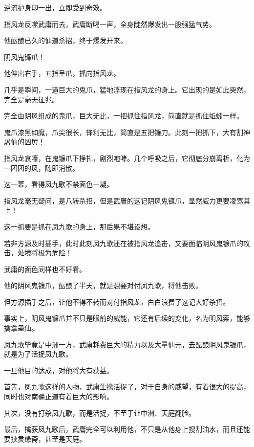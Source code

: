 
\begin{this_body}



逆流护身印一出，立即受到奇效。

指风龙反噬武庸而去，武庸断喝一声，全身陡然爆发出一股强猛气势。

他酝酿已久的仙道杀招，终于爆发开来。

阴风鬼镰爪！

他伸出右手，五指呈爪，抓向指风龙。

几乎是瞬间，一道巨大的鬼爪，猛地浮现在指风龙的身上。它出现的是如此突然，完全是毫无征兆。

完全由阴风组成的鬼爪，巨大无比，一把抓住指风龙，简直就是抓住蚯蚓一样。

鬼爪漆黑如魔，爪尖很长，锋利无比，简直是五把镰刀。此刻一把抓下，大有割神屠仙的凶厉！

指风龙哀嚎，在鬼镰爪下挣扎，剧烈咆哮。几个呼吸之后，它彻底分崩离析，化为一团团的风，随即消散。

这一幕，看得凤九歌不禁面色一凝。

指风龙毫无疑问，是八转杀招，但是武庸的这记阴风鬼镰爪，显然威力更要凌驾其上！

这一抓要是抓在凤九歌的身上，那后果不堪设想。

若非方源及时插手，此时此刻凤九歌还在被指风龙追击，又要面临阴风鬼镰爪的攻击，处境将极为危险！

武庸的面色同样也不好看。

他的阴风鬼镰爪，酝酿了半天，就是想要对付凤九歌，将他击败。

但方源插手之后，让他不得不转而对付指风龙，白白浪费了这记大好杀招。

事实上，阴风鬼镰爪并不只是眼前的威能，它还有后续的变化，名为阴风索，能够擒拿蛊仙。

凤九歌毕竟是中洲一方，武庸耗费巨大的精力以及大量仙元，去酝酿阴风鬼镰爪，就是为了活捉凤九歌。

一旦他目的达成，对他将大有获益。

首先，凤九歌这样的人物，武庸生擒活捉了，对于自身的威望，有着很大的提高，同时也对南疆正道有着巨大的影响。

其次，没有打杀凤九歌，而是活捉，不至于让中洲、天庭翻脸。

最后，擒获凤九歌后，武庸完全可以利用他，不只是从他身上搜刮油水，而且还能要挟灵缘斋，甚至是天庭。


\end{this_body}
